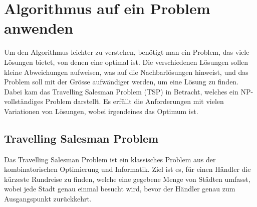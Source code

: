 %
%
%
%
\section{Algorithmus auf ein Problem anwenden
\label{buch:paper:varalg:section:find_problem}}
Um den Algorithmus leichter zu verstehen, benötigt man ein Problem, das 
viele Lösungen bietet, von denen eine optimal ist. Die verschiedenen 
Lösungen sollen kleine Abweichungen aufweisen, was auf die Nachbarlösungen hinweist, 
und das Problem soll mit der Grösse aufwändiger werden, um eine 
Lösung zu finden. Dabei kam das Travelling Salesman Problem (TSP) 
in Betracht, welches ein NP-vollständiges Problem darstellt. Es 
erfüllt die Anforderungen mit vielen Variationen von Lösungen, wobei
irgendeines das Optimum ist.

\subsection{Travelling Salesman Problem
\label{buch:paper:varalg:subsection:tsp}}
Das Travelling Salesman Problem ist ein klassisches Problem 
aus der kombinatorischen Optimierung und Informatik. Ziel ist es, 
für einen Händler die kürzeste Rundreise zu finden, welche eine 
gegebene Menge von Städten umfasst, wobei jede Stadt 
genau einmal besucht wird, bevor der Händler genau zum Ausgangspunkt 
zurückkehrt. 
